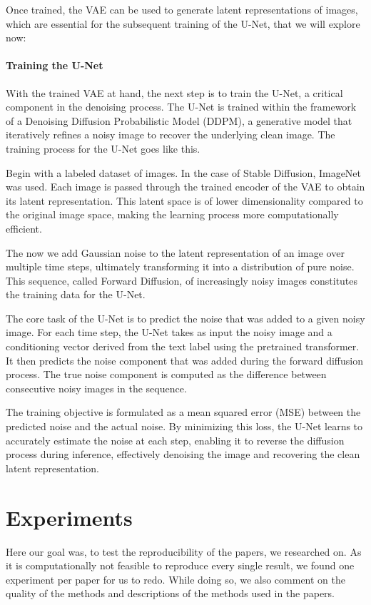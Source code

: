 \documentclass[11pt]{article}
\begin{document}
Once trained, the VAE can be used to generate latent representations of images, which are essential for the subsequent training of the U-Net, that we will explore now:

\paragraph{Training the U-Net}
With the trained VAE at hand, the next step is to train the U-Net, a critical component in the denoising process. The U-Net is trained within the framework of a Denoising Diffusion Probabilistic Model (DDPM)\cite{ho2020denoisingdiffusionprobabilisticmodels}, a generative model that iteratively refines a noisy image to recover the underlying clean image. The training process for the U-Net goes like this.

Begin with a labeled dataset of images. In the case of Stable Diffusion, ImageNet\cite{deng2009imagenet} was used. Each image is passed through the trained encoder of the VAE to obtain its latent representation. This latent space is of lower dimensionality compared to the original image space, making the learning process more computationally efficient.

The now we add Gaussian noise to the latent representation of an image over multiple time steps, ultimately transforming it into a distribution of pure noise. This sequence, called Forward Diffusion, of increasingly noisy images constitutes the training data for the U-Net.

The core task of the U-Net is to predict the noise that was added to a given noisy image. For each time step, the U-Net takes as input the noisy image and a conditioning vector derived from the text label using the pretrained transformer. It then predicts the noise component that was added during the forward diffusion process. The true noise component is computed as the difference between consecutive noisy images in the sequence.

The training objective is formulated as a mean squared error (MSE) between the predicted noise and the actual noise. By minimizing this loss, the U-Net learns to accurately estimate the noise at each step, enabling it to reverse the diffusion process during inference, effectively denoising the image and recovering the clean latent representation.




\newpage
\section{Experiments}
Here our goal was, to test the reproducibility of the papers, we researched on. As it is computationally not feasible to reproduce every single result, we found one experiment per paper for us to redo. While doing so, we also comment on the quality of the methods and descriptions of the methods used in the papers. 
\end{document}

